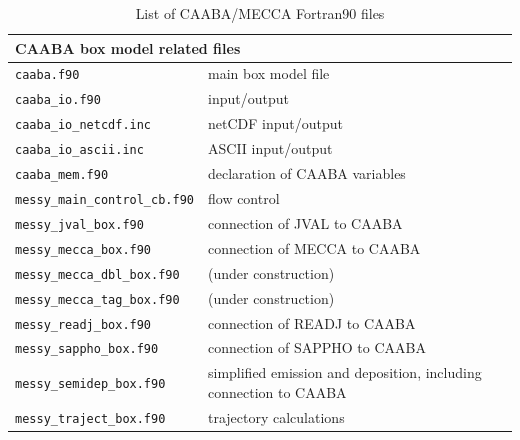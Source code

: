 \documentclass[twoside]{article}
\begin{document}
\begin{table}%
  \begin{center}
    \caption{List of CAABA/MECCA Fortran90 files}
    \label{tab:files}
    \begin{tabular}{lp{}}
      \hline
      \multicolumn{2}{l}{CAABA box model related files}\\
      \hline
      \verb|caaba.f90|                         & main box model file\\
      \verb|caaba_io.f90|                      & input/output\\
      \verb|caaba_io_netcdf.inc|               & netCDF input/output\\
      \verb|caaba_io_ascii.inc|                & ASCII input/output\\
      \verb|caaba_mem.f90|                     & declaration of CAABA variables\\
      \verb|messy_main_control_cb.f90|         & flow control\\
      \verb|messy_jval_box.f90|                & connection of JVAL to CAABA\\
      \verb|messy_mecca_box.f90|               & connection of MECCA to CAABA\\
      \verb|messy_mecca_dbl_box.f90|           & (under construction)\\
      \verb|messy_mecca_tag_box.f90|           & (under construction)\\
      \verb|messy_readj_box.f90|               & connection of READJ to CAABA\\
      \verb|messy_sappho_box.f90|              & connection of SAPPHO to CAABA\\
      \verb|messy_semidep_box.f90|             & simplified emission and
                                                 deposition, including
                                                 connection to CAABA\\
      \verb|messy_traject_box.f90|             & trajectory calculations\\

\end{tabular}
\end{center}
\end{table}
\end{document}
